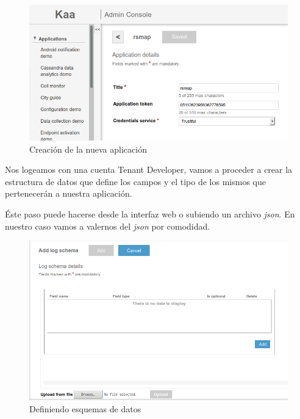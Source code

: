 \begin{figure}[!ht]
  \begin{center}
    \includegraphics[scale=0.50]{../images/kaa/11.png}
		\caption{Creación de la nueva aplicación}
    \label{fig:kaa}
	\end{center}
\end{figure}

Nos logeamos con una cuenta Tenant Developer, vamos a proceder a crear la estructura de datos que define los campos y el tipo de los mismos que pertenecerán a nuestra aplicación.

Éste paso puede hacerse desde la interfaz web o subiendo un archivo \textit{json}. En nuestro caso vamos a valernos del \textit{json} por comodidad.

\begin{figure}[!ht]
  \begin{center}
    \includegraphics[scale=0.45]{../images/kaa/11-2.png}
		\caption{Definiendo esquemas de datos}
    \label{fig:kaa}
	\end{center}
\end{figure}

